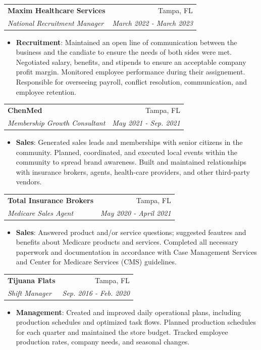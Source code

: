 \documentclass[letterpaper,]{article}
\makeatletter
\newcommand{\resumeItem}[2]{
  \item\small{
    \textbf{#1}{: #2 \vspace{-2pt}}
  }
}
\newcommand{\resumeSubheading}[4]{
  \vspace{-1pt}\item
    \begin{tabular*}{0.97\textwidth}[t]{l@{\extracolsep{\fill}}r}
      \textbf{#1} & #2 \\
      \textit{\small#3} & \textit{\small #4} \\
    \end{tabular*}
    \vspace{-5pt}
}
\newcommand{\resumeItemListStart}{\begin{itemize}}
\newcommand{\resumeItemListEnd}{\end{itemize}\vspace{-5pt}}
\makeatother
\begin{document}
   \resumeSubheading
      {Maxim Healthcare Services}{Tampa, FL} 
      {National Recruitment Manager}{March 2022 - March 2023}
      \resumeItemListStart
        \resumeItem{Recruitment}
          {Maintained an open line of communication between the business and the candiate to ensure the needs of both sides were met.
           Negotiated salary, benefits, and stipends to ensure an acceptable company profit margin. 
           Monitored employee performance during their assignement.
           Responsible for overseeing payroll, conflict resolution, communication, and employee retention.}
      \resumeItemListEnd


   \resumeSubheading
      {ChenMed}{Tampa, FL} 
      {Membership Growth Consultant}{May 2021 - Sep. 2021}
      \resumeItemListStart
        \resumeItem{Sales}
          {Generated sales leads and memberships with senior citizens in the community. 
          Planned, coordinated, and executed local events within the community to spread brand awareness. 
          Built and maintained relationships with insurance brokers, agents, health-care providers, and other third-party vendors.}
      \resumeItemListEnd

   \resumeSubheading
      {Total Insurance Brokers}{Tampa, FL} 
      {Medicare Sales Agent}{May 2020 - April 2021}
      \resumeItemListStart
        \resumeItem{Sales}
          {Answered product and/or service questions; suggested feautres and benefits about Medicare products and services.
          Completed all necessary paperwork and documentation in accordance with Case Management Services and Center for Medicare Services (CMS) guidelines.}
      \resumeItemListEnd

   \resumeSubheading
      {Tijuana Flats}{Tampa, FL} 
      {Shift Manager}{Sep. 2016 - Feb. 2020}
      \resumeItemListStart
        \resumeItem{Management}
          {Created and improved daily operational plans, including production schedules and optimized task flows.
          Planned production schedules for each quarter and maintained the store budget.
          Tracked employee production rates, company needs, and seasonal changes.}
      \resumeItemListEnd
\end{document}
